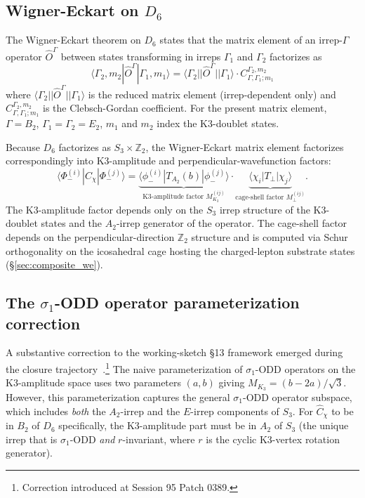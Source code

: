 \documentclass[11pt,letterpaper]{article}
\newcommand{\Cchi}{\hat{C}_\chi}
\newcommand{\Dsix}{D_6}
\newcommand{\Sthree}{S_3}
\begin{document}
\subsection{Wigner-Eckart on $\Dsix$}\label{sec:wigner_eckart_d6}

The Wigner-Eckart theorem on $\Dsix$ states that the matrix element of an irrep-$\Gamma$ operator $\hat{O}^{\Gamma}$ between states transforming in irreps $\Gamma_1$ and $\Gamma_2$ factorizes as
\[
\langle \Gamma_2, m_2 | \hat{O}^{\Gamma} | \Gamma_1, m_1 \rangle = \langle \Gamma_2 || \hat{O}^{\Gamma} || \Gamma_1 \rangle \cdot C^{\Gamma_2, m_2}_{\Gamma, \Gamma_1; m_1}
\]
where $\langle \Gamma_2 || \hat{O}^{\Gamma} || \Gamma_1 \rangle$ is the reduced matrix element (irrep-dependent only) and $C^{\Gamma_2, m_2}_{\Gamma, \Gamma_1; m_1}$ is the Clebsch-Gordan coefficient. For the present matrix element, $\Gamma = B_2$, $\Gamma_1 = \Gamma_2 = E_2$, $m_1$ and $m_2$ index the K3-doublet states.

Because $\Dsix$ factorizes as $\Sthree \times \mathbb{Z}_2$, the Wigner-Eckart matrix element factorizes correspondingly into K3-amplitude and perpendicular-wavefunction factors:
\begin{equation}\label{eq:we_factorization}
\langle \Phi_-^{(i)} | \Cchi | \Phi_-^{(j)} \rangle = \underbrace{\langle \phi_-^{(i)} | T_{A_2}(b) | \phi_-^{(j)} \rangle}_{\text{K3-amplitude factor } M_{K_3}^{(ij)}} \cdot \underbrace{\langle \chi_i | T_\perp | \chi_j \rangle}_{\text{cage-shell factor } M_\perp^{(ij)}}.
\end{equation}
The K3-amplitude factor depends only on the $\Sthree$ irrep structure of the K3-doublet states and the $A_2$-irrep generator of the operator. The cage-shell factor depends on the perpendicular-direction $\mathbb{Z}_2$ structure and is computed via Schur orthogonality on the icosahedral cage hosting the charged-lepton substrate states (\S\ref{sec:composite_we}).

\subsection{The $\sigma_1$-ODD operator parameterization correction}\label{sec:sigma1_odd_correction}

A substantive correction to the working-sketch §13 framework emerged during the closure trajectory~\cite{abshier_capotauro_subclaim_c_sketch}.\footnote{Correction introduced at Session 95 Patch 0389.} The naive parameterization of $\sigma_1$-ODD operators on the K3-amplitude space uses two parameters $(a, b)$ giving $M_{K_3} = (b - 2a)/\sqrt{3}$. However, this parameterization captures the general $\sigma_1$-ODD operator subspace, which includes \emph{both} the $A_2$-irrep and the $E$-irrep components of $\Sthree$. For $\Cchi$ to be in $B_2$ of $\Dsix$ specifically, the K3-amplitude part must be in $A_2$ of $\Sthree$ (the unique irrep that is $\sigma_1$-ODD \emph{and} $r$-invariant, where $r$ is the cyclic K3-vertex rotation generator).
\end{document}

